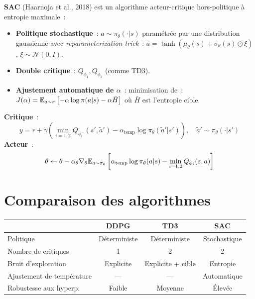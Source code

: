 \begin{definition}[SAC]
\textbf{SAC} (Haarnoja et al., 2018) est un algorithme acteur-critique hors-politique
\`a entropie maximale~:
\begin{itemize}
    \item \textbf{Politique stochastique}~: $a \sim \pi_\theta(\cdot|s)$ param\'etr\'ee
    par une distribution gaussienne avec \emph{reparameterization trick}~:
    $a = \tanh(\mu_\theta(s) + \sigma_\theta(s) \odot \xi)$, $\xi \sim \mathcal{N}(0,I)$.
    \item \textbf{Double critique}~: $Q_{\phi_1}, Q_{\phi_2}$ (comme TD3).
    \item \textbf{Ajustement automatique de $\alpha$}~: minimisation de~:
    $J(\alpha) = \mathbb{E}_{a \sim \pi}\left[-\alpha \log \pi(a|s) - \alpha \bar{H}\right]$
    o\`u $\bar{H}$ est l'entropie cible.
\end{itemize}
\end{definition}

\begin{formules}[title=\textbf{Mises \`a jour SAC}]
\textbf{Critique}~:
\[
    y = r + \gamma \left(\min_{i=1,2} Q_{\phi_i^-}(s', \tilde{a}')
    - \alpha_{\text{temp}} \log \pi_\theta(\tilde{a}'|s')\right), \quad
    \tilde{a}' \sim \pi_\theta(\cdot|s')
\]
\textbf{Acteur}~:
\[
    \theta \leftarrow \theta - \alpha_\theta \nabla_\theta \mathbb{E}_{a \sim \pi_\theta}\left[
    \alpha_{\text{temp}} \log \pi_\theta(a|s) - \min_{i=1,2} Q_{\phi_i}(s, a)
    \right]
\]
\end{formules}

\section{Comparaison des algorithmes}

\begin{center}
\renewcommand{\arraystretch}{1.3}
\begin{tabular}{lccc}
    \toprule
    & \textbf{DDPG} & \textbf{TD3} & \textbf{SAC} \\
    \midrule
    Politique & D\'eterministe & D\'eterministe & Stochastique \\
    Nombre de critiques & 1 & 2 & 2 \\
    Bruit d'exploration & Explicite & Explicite + cible & Entropie \\
    Ajustement de temp\'erature & --- & --- & Automatique \\
    Robustesse aux hyperp. & Faible & Moyenne & \'Elev\'ee \\
    \bottomrule
\end{tabular}
\end{center}

